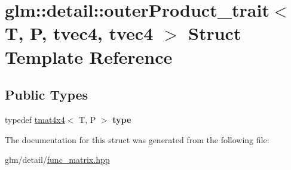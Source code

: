 \hypertarget{structglm_1_1detail_1_1outerProduct__trait_3_01T_00_01P_00_01tvec4_00_01tvec4_01_4}{\section{glm\-:\-:detail\-:\-:outer\-Product\-\_\-trait$<$ T, P, tvec4, tvec4 $>$ Struct Template Reference}
\label{structglm_1_1detail_1_1outerProduct__trait_3_01T_00_01P_00_01tvec4_00_01tvec4_01_4}
}
\subsection*{Public Types}
\begin{DoxyCompactItemize}
\item 
\hypertarget{structglm_1_1detail_1_1outerProduct__trait_3_01T_00_01P_00_01tvec4_00_01tvec4_01_4_a89f0d2b33be6604293d1373176291811}{typedef \hyperlink{structglm_1_1tmat4x4}{tmat4x4}$<$ T, P $>$ {\bfseries type}}\label{structglm_1_1detail_1_1outerProduct__trait_3_01T_00_01P_00_01tvec4_00_01tvec4_01_4_a89f0d2b33be6604293d1373176291811}

\end{DoxyCompactItemize}


The documentation for this struct was generated from the following file\-:\begin{DoxyCompactItemize}
\item 
glm/detail/\hyperlink{func__matrix_8hpp}{func\-\_\-matrix.\-hpp}\end{DoxyCompactItemize}

